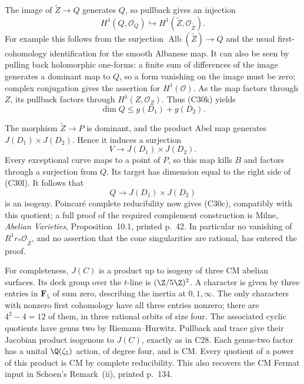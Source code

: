 The image of $\widetilde Z\to Q$ generates $Q$,
so pullback gives an injection
\[
         H^1(Q,\mathcal O_Q)
                         \hookrightarrow H^1(\widetilde Z,
                                                      \mathcal O_{\widetilde Z}).
\]
For example this follows from the surjection
$\operatorname{Alb}(\widetilde Z)\to Q$ and the
usual first-cohomology identification for the smooth
Albanese map.  It can also be seen by pulling back
holomorphic one-forms: a finite sum of differences
of the image generates a dominant map to $Q$, so
a form vanishing on the image must be zero; complex
conjugation gives the assertion for $H^1(\mathcal O)$.
As the map factors through $Z$, its pullback factors
through $H^1(Z,\mathcal O_Z)$.  Thus (C30k) yields
\[
                      \dim Q\leq g(D_1)+g(D_2).
                                                        \tag{C30l}
\]

The morphism $\widetilde Z\to P$ is dominant, and
the product Abel map generates
$J(D_1)\times J(D_2)$.  Hence it induces a surjection
\[
                    V\longrightarrow J(D_1)\times J(D_2).
\]
Every exceptional curve maps to a point of $P$, so
this map kills $B$ and factors through a surjection
from $Q$.  Its target has dimension equal to the
right side of (C30l).  It follows that
\[
                       Q\longrightarrow J(D_1)\times J(D_2)
\]
is an isogeny.  Poincar\'e complete reducibility now
gives (C30c), compatibly with this quotient; a full
proof of the required complement construction is
Milne, \emph{Abelian Varieties}, Proposition~10.1,
printed p.~42.  In particular no vanishing of
$R^1r_*\mathcal O_{\widetilde Z}$, and no assertion
that the cone singularities are rational, has entered
the proof.

For completeness, $J(C)$ is a product up to isogeny
of three CM abelian surfaces.  Its deck group over
the $t$-line is $(\Z/5\Z)^2$.  A character is given
by three entries in $\mathbf F_5$ of sum zero,
describing the inertia at $0,1,\infty$.  The only
characters with nonzero first cohomology have all
three entries nonzero; there are $4^2-4=12$ of them,
in three rational orbits of size four.  The associated
cyclic quotients have genus two by
Riemann--Hurwitz.  Pullback and trace give their
Jacobian product isogenous to $J(C)$, exactly as in
C28.  Each genus-two factor has a unital
$\Q(\zeta_5)$ action, of degree four, and is CM.
Every quotient of a power of this product is CM by
complete reducibility.  This also recovers the CM
Fermat input in Schoen's Remark~(ii), printed p.~134.

